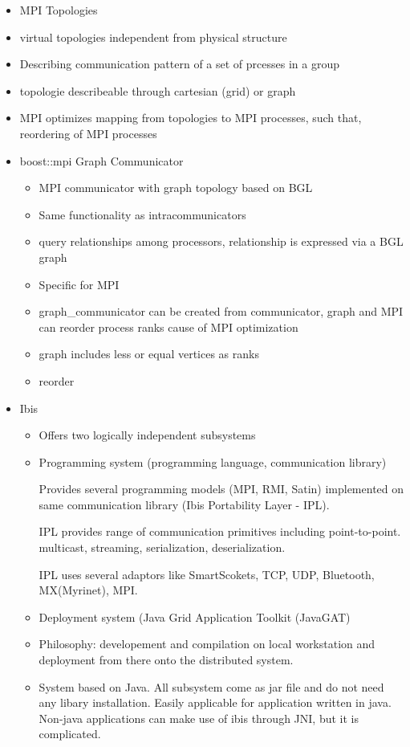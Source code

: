 \begin{itemize}

\item MPI Topologies
\item virtual topologies independent from physical structure
\item Describing communication pattern of a set of prcesses in a group
\item topologie describeable through cartesian (grid) or graph 
\item MPI optimizes mapping from topologies to MPI processes,
  such that, reordering of MPI processes

\item boost::mpi Graph Communicator
  \begin{itemize}
  \item MPI communicator with graph topology based on BGL
  \item Same functionality as intracommunicators
  \item query relationships among processors, relationship is expressed via a BGL graph
  \item Specific for MPI
  \item graph\_communicator can be created from communicator, graph and MPI can reorder process ranks cause of MPI optimization
  \item graph includes less or equal vertices as ranks
  \item reorder
  \end{itemize}

\item Ibis \cite{ref:ibis}
  \begin{itemize}
  \item Offers two logically independent subsystems
  \item Programming system (programming language, communication
    library)

    Provides several programming models (MPI, RMI, Satin)
    implemented on same communication library (Ibis Portability
    Layer - IPL).

    IPL provides range of communication primitives including
    point-to-point.  multicast, streaming, serialization,
    deserialization.

    IPL uses several adaptors like SmartScokets, TCP, UDP,
    Bluetooth, MX(Myrinet), MPI.

  \item Deployment system (Java Grid Application Toolkit (JavaGAT)
  \item Philosophy: developement and compilation on local
    workstation and deployment from there onto the distributed
    system.
  \item System based on Java. All subsystem come as jar file and do
    not need any libary installation. Easily applicable for
    application written in java. Non-java applications can make use
    of ibis through JNI, but it is complicated.
  \end{itemize}



\end{itemize}
